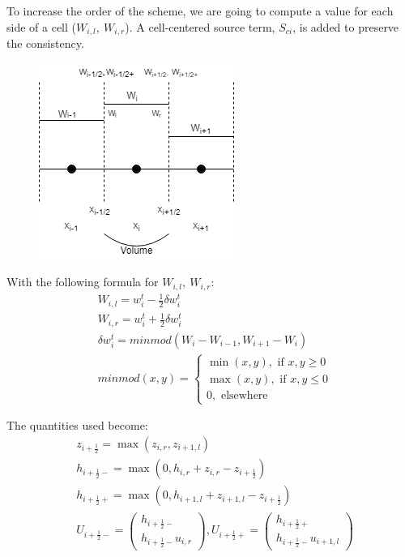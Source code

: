         To increase the order of the scheme, we are going to compute a value for each side of a cell ($W_{i,l},~W_{i,r}$). A cell-centered source term, $S_{ci}$, is added to preserve the consistency.
        \begin{figure}[h]
            \centering
            \includegraphics{2ndorder.png}
            \label{2ndorder}
        \end{figure}
        With the following formula for $W_{i,l},~W_{i,r}$:
        \begin{align*}
            &W_{i,l}=w^t_i - \frac{1}{2}\delta w^t_i \\
            &W_{i,r}=w^t_i + \frac{1}{2}\delta w^t_i \\
            &\delta w^t_i = minmod(W_{i} - W_{i-1}, W_{i+1} -W_{i}) \\
            &minmod(x,y) = \begin{cases}  \min(x,y), \text{ if } x,y \geq 0 \\
                                        \max(x,y), \text{ if } x,y \leq 0\\
                                        0, \text{ elsewhere}
                                        \end{cases}
        \end{align*}
        
        The quantities used become:
        \begin{align*}
            &z_{i+\frac{1}{2}} = \max(z_{i,r}, z_{i+1,l})\\
            &h_{i+\frac{1}{2}-} = \max(0, h_{i,r}+z_{i,r} - z_{i+\frac{1}{2}}) \\
            &h_{i+\frac{1}{2}+} = \max(0, h_{i+1,l}+z_{i+1,l} -z_{i+\frac{1}{2}}) \\
            &U_{i+\frac{1}{2}-} =\begin{pmatrix} h_{i+\frac{1}{2}-} \\ h_{i+\frac{1}{2}-}u_{i,r}\end{pmatrix} ,U_{i+\frac{1}{2}+} =\begin{pmatrix} h_{i+\frac{1}{2}+} \\ h_{i+\frac{1}{2}-}u_{i+1,l}\end{pmatrix}
        \end{align*}
        
